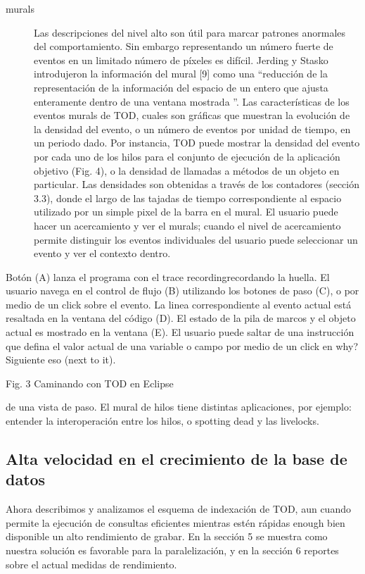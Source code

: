 \documentclass[12pt,a4paper]{report}
\begin{document}
\begin{description}
	\item[murals] Las descripciones del nivel alto son útil para marcar patrones anormales del comportamiento.  Sin embargo representando un número fuerte de eventos en un limitado número de píxeles es difícil.  Jerding y Stasko introdujeron la información del mural [9] como una “reducción de la representación de la información del espacio de un entero que ajusta enteramente dentro de una ventana mostrada ”.  Las características de los eventos murals de TOD, cuales son gráficas que muestran la evolución de la densidad del evento, o un número de eventos por unidad de tiempo, en un periodo dado.  Por instancia, TOD puede mostrar la densidad del evento por cada uno de los hilos para el conjunto de ejecución de la aplicación objetivo (Fig. 4), o la densidad de llamadas a métodos de un objeto en particular.  Las densidades son obtenidas a través  de los contadores (sección 3.3), donde el largo de las tajadas de tiempo correspondiente al espacio utilizado por un simple pixel de la barra en el mural.  El usuario puede hacer un acercamiento y ver el murals;  cuando el nivel de acercamiento permite distinguir los eventos individuales del usuario puede seleccionar un evento y ver el contexto dentro.
\end{description}

Botón (A) lanza el programa con el trace recording{recordando la huella}.  El usuario navega en el control de flujo (B) utilizando los botones de paso (C), o por medio de un click sobre el evento.  La linea correspondiente al evento actual está resaltada en la ventana del código (D).  El estado de la pila de marcos y el objeto actual es mostrado en la ventana (E).  El usuario puede saltar de una instrucción que defina el valor actual de una variable o campo por medio de un click en why? Siguiente eso (next to it).


Fig. 3 Caminando con TOD en Eclipse

de una vista de paso.  El mural de hilos tiene distintas aplicaciones, por ejemplo: entender la interoperación entre los hilos, o spotting dead y las livelocks.

		\subsection{Alta velocidad en el crecimiento de la base de datos}

Ahora describimos y analizamos el esquema de indexación de TOD, aun cuando permite la ejecución de consultas eficientes mientras estén rápidas enough {bien} disponible un alto rendimiento de grabar.  En la sección 5 se muestra como nuestra solución es favorable para la paralelización, y en la sección 6 reportes sobre el actual medidas de rendimiento.
\end{document}
